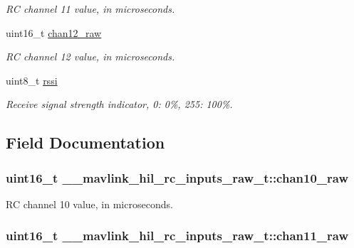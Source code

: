 \begin{DoxyCompactItemize}
\begin{DoxyCompactList}\small\item\em R\+C channel 11 value, in microseconds. \end{DoxyCompactList}\item 
uint16\+\_\+t \hyperlink{struct____mavlink__hil__rc__inputs__raw__t_a5967e01d1c858a6136505185d183a99e}{chan12\+\_\+raw}
\begin{DoxyCompactList}\small\item\em R\+C channel 12 value, in microseconds. \end{DoxyCompactList}\item 
uint8\+\_\+t \hyperlink{struct____mavlink__hil__rc__inputs__raw__t_aa126d8b574a26544c57605c5aa1f8684}{rssi}
\begin{DoxyCompactList}\small\item\em Receive signal strength indicator, 0\+: 0\%, 255\+: 100\%. \end{DoxyCompactList}\end{DoxyCompactItemize}


\subsection{Field Documentation}
\hypertarget{struct____mavlink__hil__rc__inputs__raw__t_ac49fe649301c639a71ae5a5778934a3c}{
\subsubsection[{chan10\+\_\+raw}]{\setlength{\rightskip}{0pt plus 5cm}uint16\+\_\+t \+\_\+\+\_\+mavlink\+\_\+hil\+\_\+rc\+\_\+inputs\+\_\+raw\+\_\+t\+::chan10\+\_\+raw}}\label{struct____mavlink__hil__rc__inputs__raw__t_ac49fe649301c639a71ae5a5778934a3c}


R\+C channel 10 value, in microseconds. 

\hypertarget{struct____mavlink__hil__rc__inputs__raw__t_a09b92c1ec569948809c152e74bd61655}{
\subsubsection[{chan11\+\_\+raw}]{\setlength{\rightskip}{0pt plus 5cm}uint16\+\_\+t \+\_\+\+\_\+mavlink\+\_\+hil\+\_\+rc\+\_\+inputs\+\_\+raw\+\_\+t\+::chan11\+\_\+raw}}\label{struct____mavlink__hil__rc__inputs__raw__t_a09b92c1ec569948809c152e74bd61655}


